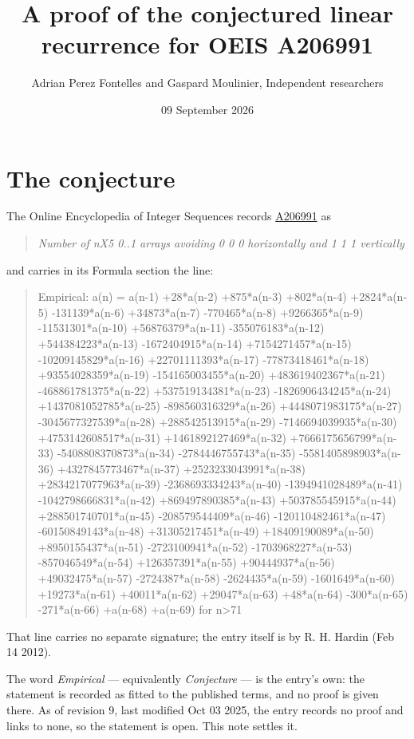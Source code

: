 \documentclass[11pt]{article}
\title{A proof of the conjectured linear recurrence for OEIS A206991}
\author{Adrian Perez Fontelles and Gaspard Moulinier, Independent researchers}
\date{09 September 2026}
\theoremstyle{definition}
\begin{document}
\maketitle
\section{The conjecture}

The Online Encyclopedia of Integer Sequences records \href{https://oeis.org/A206991}{A206991} as

\begin{quote}\itshape Number of nX5 0..1 arrays avoiding 0 0 0 horizontally and 1 1 1 vertically\end{quote}

and carries in its Formula section the line:

\begin{quote}\ttfamily Empirical: a(n) = a(n-1) +28*a(n-2) +875*a(n-3) +802*a(n-4) +2824*a(n-5) -131139*a(n-6) +34873*a(n-7) -770465*a(n-8) +9266365*a(n-9) -11531301*a(n-10) +56876379*a(n-11) -355076183*a(n-12) +544384223*a(n-13) -1672404915*a(n-14) +7154271457*a(n-15) -10209145829*a(n-16) +22701111393*a(n-17) -77873418461*a(n-18) +93554028359*a(n-19) -154165003455*a(n-20) +483619402367*a(n-21) -468861781375*a(n-22) +537519134381*a(n-23) -1826906434245*a(n-24) +1437081052785*a(n-25) -898560316329*a(n-26) +4448071983175*a(n-27) -3045677327539*a(n-28) +288542513915*a(n-29) -7146694039935*a(n-30) +4753142608517*a(n-31) +1461892127469*a(n-32) +7666175656799*a(n-33) -5408808370873*a(n-34) -2784446755743*a(n-35) -5581405898903*a(n-36) +4327845773467*a(n-37) +2523233043991*a(n-38) +2834217077963*a(n-39) -2368693334243*a(n-40) -1394941028489*a(n-41) -1042798666831*a(n-42) +869497890385*a(n-43) +503785545915*a(n-44) +288501740701*a(n-45) -208579544409*a(n-46) -120110482461*a(n-47) -60150849143*a(n-48) +31305217451*a(n-49) +18409190089*a(n-50) +8950155437*a(n-51) -2723100941*a(n-52) -1703968227*a(n-53) -857046549*a(n-54) +126357391*a(n-55) +90444937*a(n-56) +49032475*a(n-57) -2724387*a(n-58) -2624435*a(n-59) -1601649*a(n-60) +19273*a(n-61) +40011*a(n-62) +29047*a(n-63) +48*a(n-64) -300*a(n-65) -271*a(n-66) +a(n-68) +a(n-69) for n>71\end{quote}

That line carries no separate signature; the entry itself is by R. H. Hardin (Feb 14 2012).

The word {\itshape Empirical} --- equivalently {\itshape Conjecture} --- is the entry's own: the statement is recorded as fitted to the published terms, and no proof is given there. As of revision 9, last modified Oct 03 2025, the entry records no proof and links to none, so the statement is open. This note settles it.
\end{document}
